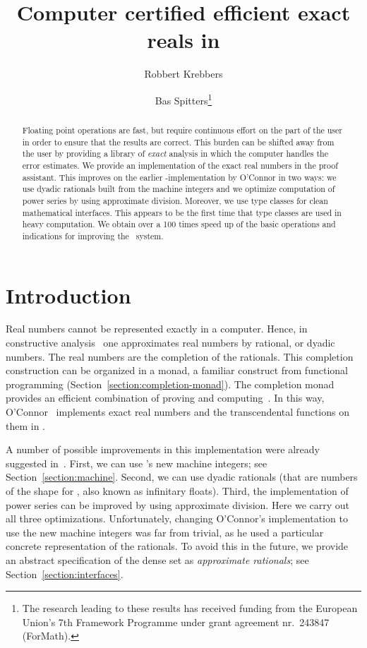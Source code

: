 \documentclass[a4paper,10pt,runningheads]{llncs}
\begin{document}
\title{Computer certified efficient exact reals in \Coq}
\author{Robbert Krebbers \and Bas Spitters\thanks{The research leading to these results has received funding from the European Union's 7th Framework Programme under grant agreement nr.~243847 (ForMath).}}
\maketitle

\begin{abstract}
Floating point operations are fast, but require continuous effort on the part of the user in order to ensure that the results are correct.
This burden can be shifted away from the user by providing a library of \emph{exact} analysis in which the computer handles the error estimates.
We provide an implementation of the exact real numbers in the \Coq{} proof assistant. This improves on the earlier \Coq-implementation by O'Connor in two ways: we use dyadic rationals built from the machine integers and we optimize computation of power series by using approximate division. Moreover, we use type classes for clean mathematical interfaces. This appears to be the first time that type classes are used in heavy computation. We obtain over a 100 times speed up of the basic operations and indications for improving the \Coq\ system.
\end{abstract}

\section{Introduction}
Real numbers cannot be represented exactly in a computer. Hence, in constructive analysis~\cite{Bishop67} one approximates real numbers by rational, or dyadic numbers. The real numbers are the completion of the rationals. This completion construction can be organized in a monad, a familiar construct from functional programming (Section~\ref{section:completion-monad}). The completion monad provides an efficient combination of proving and computing~\cite{OConnor:mscs}. In this way, O'Connor~\cite{Oconnor:real} implements exact real numbers and the transcendental functions on them in \Coq.

A number of possible improvements in this implementation were already suggested in~\cite{Riemann}. First, we can use \Coq's new machine integers; see Section~\ref{section:machine}. Second, we can use dyadic rationals (that are numbers of the shape  for , also known as infinitary floats). Third, the implementation of power series can be improved by using approximate division. Here we carry out all three optimizations. Unfortunately, changing O'Connor's implementation to use the new machine integers was far from trivial, as he used a particular concrete representation of the rationals. To avoid this in the future, we provide an abstract specification of the dense set as \emph{approximate rationals}; see Section~\ref{section:interfaces}.
\end{document}
